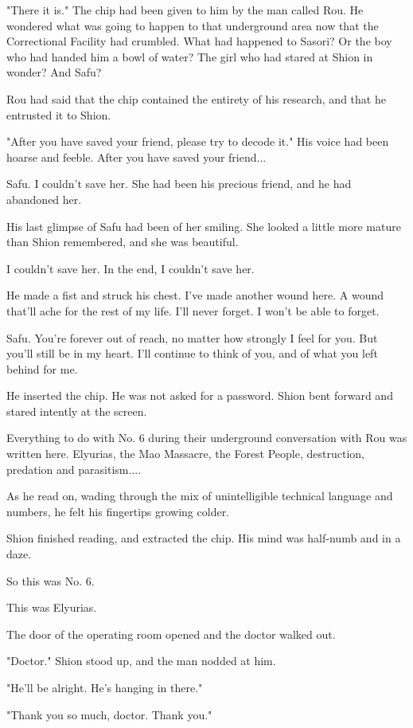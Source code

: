 "There it is." The chip had been given to him by the man called Rou. He
wondered what was going to happen to that underground area now that the
Correctional Facility had crumbled. What had happened to Sasori? Or the
boy who had handed him a bowl of water? The girl who had stared at Shion
in wonder? And Safu?

Rou had said that the chip contained the entirety of his research, and
that he entrusted it to Shion.

"After you have saved your friend, please try to decode it." His voice
had been hoarse and feeble. After you have saved your friend...

Safu. I couldn't save her. She had been his precious friend, and he had
abandoned her.

His last glimpse of Safu had been of her smiling. She looked a little
more mature than Shion remembered, and she was beautiful.

I couldn't save her. In the end, I couldn't save her.

He made a fist and struck his chest. I've made another wound here. A
wound that'll ache for the rest of my life. I'll never forget. I won't
be able to forget.

Safu. You're forever out of reach, no matter how strongly I feel for
you. But you'll still be in my heart. I'll continue to think of you, and
of what you left behind for me.

He inserted the chip. He was not asked for a password. Shion bent
forward and stared intently at the screen.

Everything to do with No. 6 during their underground conversation with
Rou was written here. Elyurias, the Mao Massacre, the Forest People,
destruction, predation and parasitism....

As he read on, wading through the mix of unintelligible technical
language and numbers, he felt his fingertips growing colder.

Shion finished reading, and extracted the chip. His mind was half-numb
and in a daze.

So this was No. 6.

This was Elyurias.

The door of the operating room opened and the doctor walked out.

"Doctor." Shion stood up, and the man nodded at him.

"He'll be alright. He's hanging in there."

"Thank you so much, doctor. Thank you."

